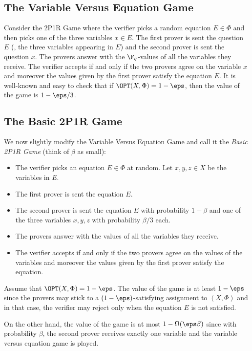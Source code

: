 \subsection{The Variable Versus Equation Game}

Consider the 2P1R Game where the verifier picks a random equation $E \in \Phi$ and then picks one of the three
variables $x \in E$. The first prover is sent the question $E$ (\ie, the three variables appearing in $E$)
and the second prover is sent the question $x$. The provers answer with the $\F_q$-values of all the variables
they receive.
The verifier accepts if and only if the two provers agree on the variable $x$ and moreover
the values given by the first prover
      satisfy the equation $E$. It is well-known and easy to check that
if $\OPT(X,\Phi) = 1-\eps$, then the value of the game is $1- {\eps}/{3}$.

\subsection{The Basic 2P1R Game}

We now slightly modify the Variable Versus Equation Game and call it the \emph{Basic 2P1R Game}
(think of $\beta$ as small):


\begin{itemize}
\item The verifier picks an equation $E \in \Phi$ at random. Let $x, y, z \in X$ be the variables in $E$.
\item The first prover is sent the equation $E$.
\item The second prover is sent the equation $E$ with probability $1-\beta$ and one of the three
variables $x,y, z$ with probability ${\beta}/{3}$ each.
\item The provers answer with the values of all the variables they receive.
\item The verifier accepts if and only if the two provers agree on the
      values of the variables and moreover the values given by the first prover
      satisfy the equation.
\end{itemize}

Assume that $\OPT(X,\Phi) = 1-\eps$.  The value of the game is at least $1-\eps$ since the provers
may stick to a $(1-\eps)$-satisfying assignment to $(X,\Phi)$ and in that case, the verifier may reject only
when the equation $E$ is not satisfied.

On the other hand, the value of the game is at most
$1-\Omega(\eps \beta)$ since with probability $\beta$, the second prover receives exactly one
variable and the variable versus equation game is played.

